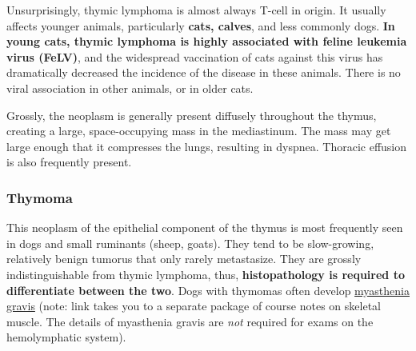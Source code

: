 \documentclass[openany]{article}
\begin{document}
Unsurprisingly, thymic lymphoma is almost always T-cell in origin. It
usually affects younger animals, particularly \textbf{cats, calves}, and
less commonly dogs. \textbf{In young cats, thymic lymphoma is highly
associated with feline leukemia virus (FeLV)}, and the widespread
vaccination of cats against this virus has dramatically decreased the
incidence of the disease in these animals. There is no viral association
in other animals, or in older cats.

Grossly, the neoplasm is generally present diffusely throughout the
thymus, creating a large, space-occupying mass in the mediastinum. The
mass may get large enough that it compresses the lungs, resulting in
dyspnea. Thoracic effusion is also frequently present.

\subsubsection{Thymoma}\label{thymoma}

This neoplasm of the epithelial component of the thymus is most
frequently seen in dogs and small ruminants (sheep, goats). They tend to
be slow-growing, relatively benign tumorus that only rarely metastasize.
They are grossly indistinguishable from thymic lymphoma, thus,
\textbf{histopathology is required to differentiate between the two}.
Dogs with thymomas often develop
\href{http://russfraser.ca/muscle/immune-mediate-myopathies.html\#acquired-myasthenia-gravis}{myasthenia
gravis} (note: link takes you to a separate package of course notes on
skeletal muscle. The details of myasthenia gravis are \emph{not}
required for exams on the hemolymphatic system).


\end{document}
